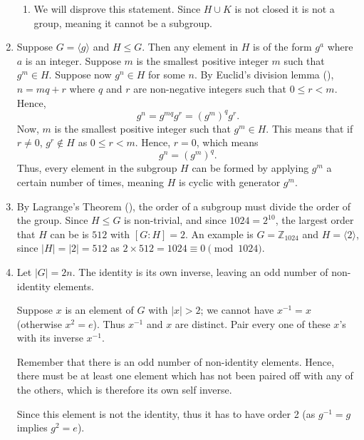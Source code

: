 \begin{enumerate}
\begin{enumerate}[label=(\alph*)]
        \item We will disprove this statement. Since $H \cup K$ is not closed it is not a group, meaning it cannot be a subgroup.
    \end{enumerate}

    \item Suppose $G = \langle g \rangle$ and $H \leq G$. Then any element in $H$ is of the form $g^a$ where $a$ is an integer. Suppose $m$ is the smallest positive integer $m$ such that $g^m \in H$. Suppose now $g^n \in H$ for some $n$. By Euclid's division lemma (), $n = mq + r$ where $q$ and $r$ are non-negative integers such that $0 \leq r < m$. Hence,
    \[
        g^n = g^{mq}g^r = (g^m)^q g^r.
    \]
    Now, $m$ is the smallest positive integer such that $g^m \in H$. This means that if $r \neq 0$, $g^r \not\in H$ as $0 \leq r < m$. Hence, $r = 0$, which means
    \[
        g^n = (g^m)^q.
    \]
    Thus, every element in the subgroup $H$ can be formed by applying $g^m$ a certain number of times, meaning $H$ is cyclic with generator $g^m$.

    \item By Lagrange's Theorem (), the order of a subgroup must divide the order of the group. Since $H \leq G$ is non-trivial, and since $1024 = 2^{10}$, the largest order that $H$ can be is $512$ with $[G:H] = 2$. An example is $G = \mathbb{Z}_{1024}$ and $H = \langle 2 \rangle$, since $|H| = |2| = 512$ as $2 \times 512 = 1024 \equiv 0 \pmod{1024}$.

    \item Let $|G| = 2n$. The identity is its own inverse, leaving an odd number of non-identity elements.
    
    Suppose $x$ is an element of $G$ with $|x| > 2$; we cannot have $x^{-1} = x$ (otherwise $x^2 = e$). Thus $x^{-1}$ and $x$ are distinct. Pair every one of these $x$'s with its inverse $x^{-1}$.

    Remember that there is an odd number of non-identity elements. Hence, there must be at least one element which has not been paired off with any of the others, which is therefore its own self inverse.

    Since this element is not the identity, thus it has to have order 2 (as $g^{-1} = g$ implies $g^2 = e$).


\end{enumerate}
